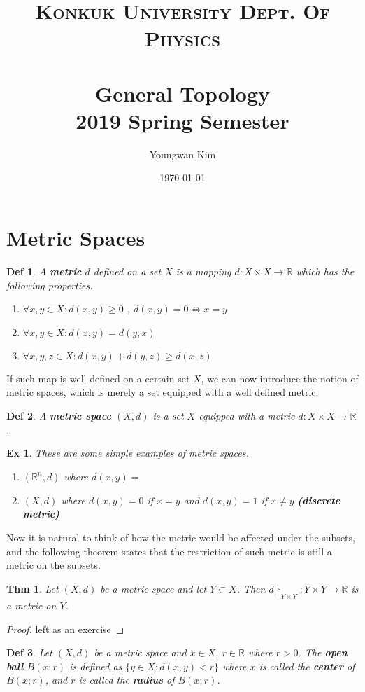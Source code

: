 \documentclass[paper=a4, fontsize=11pt]{scrartcl}
\title{	
	\normalfont \normalsize 
	\textsc{Konkuk University Dept. Of Physics} \\ [25pt] %
	\horrule{1pt} \\[0.4cm] 
	\huge General Topology \\
	\vspace{0.1in}
	\Large 2019 Spring Semester
	\horrule{1pt} \\[0.4cm] 
}
\author{Youngwan Kim}
\date{\normalsize\today}
\newcommand{\subscript}[2]{$#1 _ #2$}
\newcommand{\ball}[2]{$B({#1};{#2})$}
\newtheorem{theorem}{Thm}
\newtheorem{definition}{Def}
\newtheorem{example}{Ex}
\begin{document}
	
\maketitle	

\section{Metric Spaces} 
\vspace{2.5ex}
\begin{definition}
	A \textbf{metric} $d$ defined on a set $X$ is a mapping $d:X \times X \to \mathbb{R}$ which has the following properties.
	\begin{enumerate}[label=(\subscript{m}{{\arabic*}})]
		\item $\forall x,y \in X : d(x,y) \geq 0$ , $d(x,y)=0 \iff x=y$
		\item $\forall x,y \in X: d(x,y)=d(y,x)$
		\item $\forall x,y,z \in X : d(x,y)+d(y,z) \geq d(x,z)$\\
	\end{enumerate}
\end{definition}
If such map is well defined on a certain set $X$, we can now introduce the notion of metric spaces, which is merely a set equipped with a well defined metric.
\\
\begin{definition}
	A \textbf{metric space} $(X,d)$ is a set $X$ equipped with a metric $d:X\times X \to \mathbb{R}$.\\
\end{definition}
\begin{example} 
	These are some simple examples of metric spaces.
	\begin{enumerate}[label=\arabic*)]
		\item $(\mathbb{R}^n,d)$ where $d(x,y)=$
		\item $(X,d)$ where $d(x,y)=0$ if $x=y$ and $d(x,y)=1$ if $x\neq y$ \textbf{(discrete metric)}
	\end{enumerate}
\end{example}

Now it is natural to think of how the metric would be affected under the subsets, and the following theorem states that the restriction of such metric is still a metric on the subsets. \\
\begin{theorem}
	Let $(X,d)$ be a metric space and let $Y\subset X$. Then $d\restriction_{Y\times Y} : Y \times Y \to \mathbb{R}$ is a metric on $Y$.
\end{theorem}
\begin{proof}
	left as an exercise
\end{proof}
\vspace{2.5ex}
\begin{definition}
	Let $(X,d)$ be a metric space and $x\in X$, $r \in \mathbb{R}$ where $r>0$. The \textbf{open ball} \ball{x}{r} is defined as $\{y\in X : d(x,y)<r\}$ where $x$ is called the \textbf{center} of \ball{x}{r}, and $r$ is called the \textbf{radius} of \ball{x}{r}.\\
\end{definition}
\end{document}
